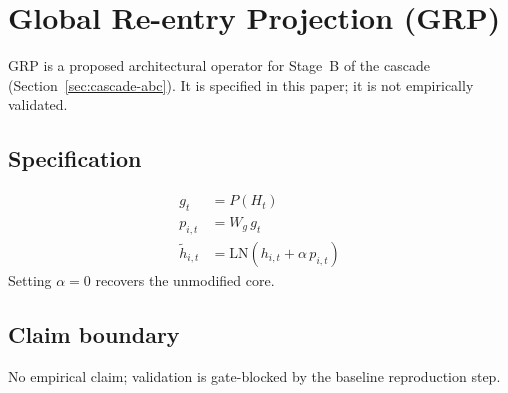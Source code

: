 \section{Global Re-entry Projection (GRP)}
\label{sec:grp}

GRP is a proposed architectural operator for Stage~B of the cascade
(Section~\ref{sec:cascade-abc}). It is specified in this paper; it is not
empirically validated.

\subsection{Specification}
\begin{align}
  g_t &= P(H_t) \\
  p_{i,t} &= W_g \, g_t \\
  \tilde{h}_{i,t} &= \mathrm{LN}(h_{i,t} + \alpha \, p_{i,t})
\end{align}
Setting $\alpha = 0$ recovers the unmodified core.

\subsection{Claim boundary}
No empirical claim; validation is gate-blocked by the baseline reproduction step.
